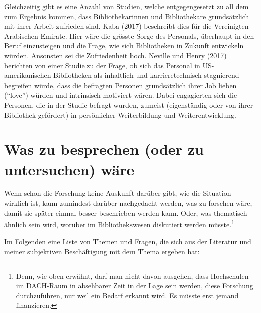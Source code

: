 \documentclass[a4paper,
fontsize=11pt,
oneside,
numbers=noperiodatend,
parskip=half-,
bibliography=totoc,
final
]{scrartcl}
\begin{document}
Gleichzeitig gibt es eine Anzahl von Studien, welche entgegengesetzt zu
all dem zum Ergebnis kommen, dass Bibliothekarinnen und Bibliothekare
grundsätzlich mit ihrer Arbeit zufrieden sind. Kaba (2017) beschreibt
dies für die Vereinigten Arabischen Emirate. Hier wäre die grösste Sorge
des Personals, überhaupt in den Beruf einzusteigen und die Frage, wie
sich Bibliotheken in Zukunft entwickeln würden. Ansonsten sei die
Zufriedenheit hoch. Neville und Henry (2017) berichten von einer Studie
zu der Frage, ob sich das Personal in US-amerikanischen Bibliotheken als
inhaltlich und karrieretechnisch stagnierend begreifen würde, dass die
befragten Personen grundsätzlich ihrer Job lieben (\enquote{love})
würden und intrinsisch motiviert wären. Dabei engagierten sich die
Personen, die in der Studie befragt wurden, zumeist (eigenständig oder
von ihrer Bibliothek gefördert) in persönlicher Weiterbildung und
Weiterentwicklung.

\hypertarget{was-zu-besprechen-oder-zu-untersuchen-wuxe4re}{%
\section*{Was zu besprechen (oder zu untersuchen)
wäre}\label{was-zu-besprechen-oder-zu-untersuchen-wuxe4re}}

Wenn schon die Forschung keine Auskunft darüber gibt, wie die Situation
wirklich ist, kann zumindest darüber nachgedacht werden, was zu forschen
wäre, damit sie später einmal besser beschrieben werden kann. Oder, was
thematisch ähnlich sein wird, worüber im Bibliothekswesen diskutiert
werden müsste.\footnote{Denn, wie oben erwähnt, darf man nicht davon
  ausgehen, dass Hochschulen im DACH-Raum in absehbarer Zeit in der Lage
  sein werden, diese Forschung durchzuführen, nur weil ein Bedarf
  erkannt wird. Es müsste erst jemand finanzieren.}

Im Folgenden eine Liste von Themen und Fragen, die sich aus der
Literatur und meiner subjektiven Beschäftigung mit dem Thema ergeben
hat:
\end{document}
